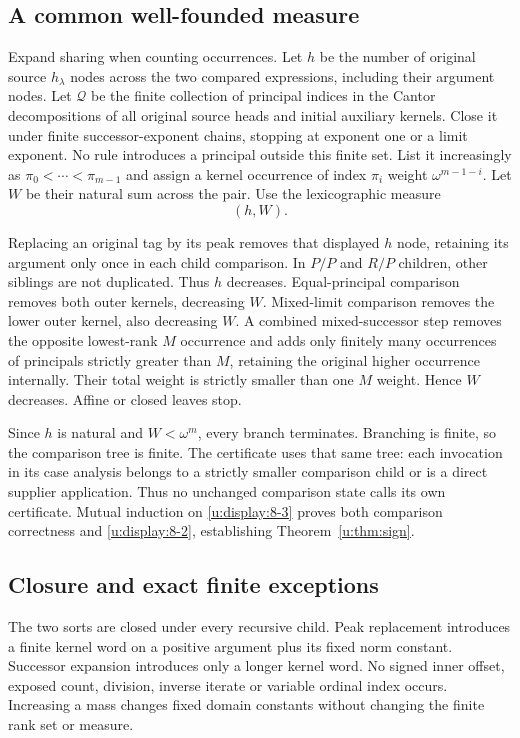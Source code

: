 \subsection{A common well-founded measure}
Expand sharing when counting occurrences. Let $h$ be the number of
original source $h_\lambda$ nodes across the two compared expressions,
including their argument nodes. Let $\mathcal Q$ be the finite collection
of principal indices in the Cantor decompositions of all original source
heads and initial auxiliary kernels. Close it under finite successor-exponent
chains, stopping at exponent one or a limit exponent. No rule introduces
a principal outside this finite set. List it increasingly as
$\pi_0<\cdots<\pi_{m-1}$ and assign a kernel occurrence of index $\pi_i$
weight $\omega^{m-1-i}$. Let $W$ be their natural sum across the pair.
Use the lexicographic measure
\begin{equation}
                             (h,W).                 \label{u:display:8-3}
\end{equation}

Replacing an original tag by its peak removes that displayed $h$ node,
retaining its argument only once in each child comparison. In $P/P$ and
$R/P$ children, other siblings are not duplicated. Thus $h$ decreases.
Equal-principal comparison removes both outer kernels, decreasing $W$.
Mixed-limit comparison removes the lower outer kernel, also decreasing $W$.
A combined mixed-successor step removes the opposite lowest-rank $M$
occurrence and adds only finitely many occurrences of principals strictly
greater than $M$, retaining the original higher occurrence internally.
Their total weight is strictly smaller than one $M$ weight. Hence $W$
decreases. Affine or closed leaves stop.

Since $h$ is natural and $W<\omega^m$, every branch terminates. Branching
is finite, so the comparison tree is finite. The certificate uses that
same tree: each invocation in its case analysis belongs to a strictly
smaller comparison child or is a direct supplier application. Thus no
unchanged comparison state calls its own certificate. Mutual induction
on \eqref{u:display:8-3} proves both comparison correctness and \eqref{u:display:8-2}, establishing
Theorem~\ref{u:thm:sign}.

\subsection{Closure and exact finite exceptions}
The two sorts are closed under every recursive child. Peak replacement
introduces a finite kernel word on a positive argument plus its fixed
norm constant. Successor expansion introduces only a longer kernel word.
No signed inner offset, exposed count, division, inverse iterate or
variable ordinal index occurs. Increasing a mass changes fixed domain
constants without changing the finite rank set or measure.

